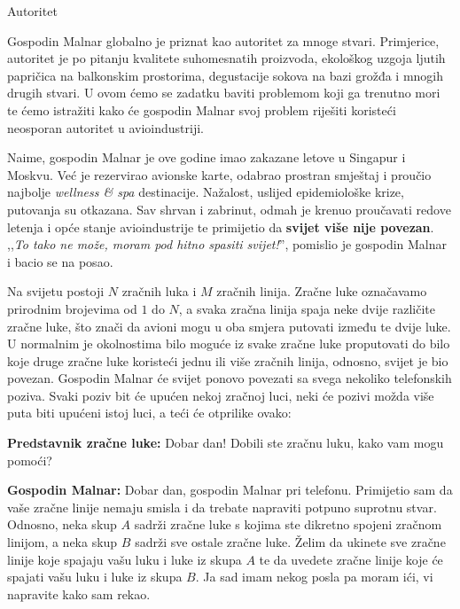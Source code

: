 \begin{statement}[
  problempoints=100,
  timelimit=1 sekunda,
  memorylimit=512 MiB,
]{Autoritet}

Gospodin Malnar globalno je priznat kao autoritet za mnoge stvari. Primjerice,
autoritet je po pitanju kvalitete suhomesnatih proizvoda, ekološkog uzgoja
ljutih papričica na balkonskim prostorima, degustacije sokova na bazi grožđa
i mnogih drugih stvari.  U ovom ćemo se zadatku baviti problemom koji ga
trenutno mori te ćemo istražiti kako će gospodin Malnar svoj problem riješiti
koristeći neosporan autoritet u avioindustriji.

Naime, gospodin Malnar je ove godine imao zakazane letove u Singapur i Moskvu.
Već je rezervirao avionske karte, odabrao prostran smještaj i proučio
najbolje \textit{wellness \& spa} destinacije. Nažalost, uslijed epidemiološke
krize, putovanja su otkazana. Sav shrvan i zabrinut, odmah je krenuo
proučavati redove letenja i opće stanje avioindustrije te primijetio da
\textbf{svijet više nije povezan}. ,,\textit{To tako ne može, moram pod hitno
spasiti svijet!}'', pomislio je gospodin Malnar i bacio se na posao.

Na svijetu postoji $N$ zračnih luka i $M$ zračnih linija. Zračne luke
označavamo prirodnim brojevima od $1$ do $N$, a svaka zračna linija spaja
neke dvije različite zračne luke, što znači da avioni mogu u oba smjera
putovati između te dvije luke. U normalnim je okolnostima bilo moguće iz
svake zračne luke proputovati do bilo koje druge zračne luke koristeći jednu
ili više zračnih linija, odnosno, svijet je bio povezan. Gospodin Malnar će
svijet ponovo povezati sa svega nekoliko telefonskih poziva. Svaki poziv bit
će upućen nekoj zračnoj luci, neki će pozivi možda više puta biti upućeni
istoj luci, a teći će otprilike ovako:

\textbf{Predstavnik zračne luke:} Dobar dan! Dobili ste zračnu luku, kako vam
mogu pomoći?

\textbf{Gospodin Malnar:} Dobar dan, gospodin Malnar pri telefonu. Primijetio
sam da vaše zračne linije nemaju smisla i da trebate napraviti potpuno
suprotnu stvar. Odnosno, neka skup $A$ sadrži zračne luke s kojima ste
dikretno spojeni zračnom linijom, a neka skup $B$ sadrži sve ostale zračne
luke. Želim da ukinete sve zračne linije koje spajaju vašu luku i luke iz
skupa $A$ te da uvedete zračne linije koje će spajati vašu luku i luke iz
skupa $B$. Ja sad imam nekog posla pa moram ići, vi napravite kako sam rekao.


\end{statement}
